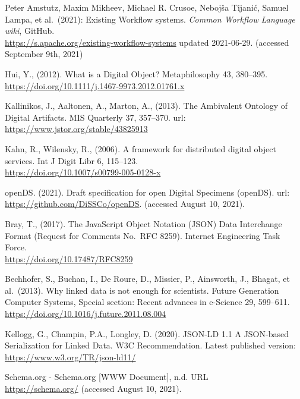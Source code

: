 \begin{thebibliography}{9}
Peter Amstutz, Maxim Mikheev, Michael R. Crusoe, Nebojša
Tijanić, Samuel Lampa, et al.~(2021): Existing Workflow systems.
\emph{Common Workflow Language wiki}, GitHub.\\
\url{https://s.apache.org/existing-workflow-systems} updated 2021-06-29.
(accessed September 9th, 2021)

Hui, Y., (2012). What is a Digital Object? Metaphilosophy 43,
380--395.\\
\url{https://doi.org/10.1111/j.1467-9973.2012.01761.x}

Kallinikos, J., Aaltonen, A., Marton, A., (2013). The
Ambivalent Ontology of Digital Artifacts. MIS Quarterly 37, 357--370.
url:\\
\url{https://www.jstor.org/stable/43825913}

Kahn, R., Wilensky, R., (2006). A framework for distributed
digital object services. Int J Digit Libr 6, 115--123.\\
\url{https://doi.org/10.1007/s00799-005-0128-x}

openDS. (2021). Draft specification for open Digital Specimens
(openDS). url:\\
\url{https://github.com/DiSSCo/openDS}. (accessed August 10, 2021).

Bray, T., (2017). The JavaScript Object Notation (JSON) Data
Interchange Format (Request for Comments No.~RFC 8259). Internet
Engineering Task Force.\\
\url{https://doi.org/10.17487/RFC8259}

Bechhofer, S., Buchan, I., De Roure, D., Missier, P.,
Ainsworth, J., Bhagat, et al.~(2013). Why linked data is not enough for
scientists. Future Generation Computer Systems, Special section: Recent
advances in e-Science 29, 599--611.\\
\url{https://doi.org/10.1016/j.future.2011.08.004}

Kellogg, G., Champin, P.A., Longley, D. (2020). JSON-LD 1.1 A
JSON-based Serialization for Linked Data. W3C Recommendation. Latest
published version:\\
\url{https://www.w3.org/TR/json-ld11/}

Schema.org - Schema.org {[}WWW Document{]}, n.d. URL\\
\url{https://schema.org/} (accessed August 10, 2021).


\end{thebibliography}
